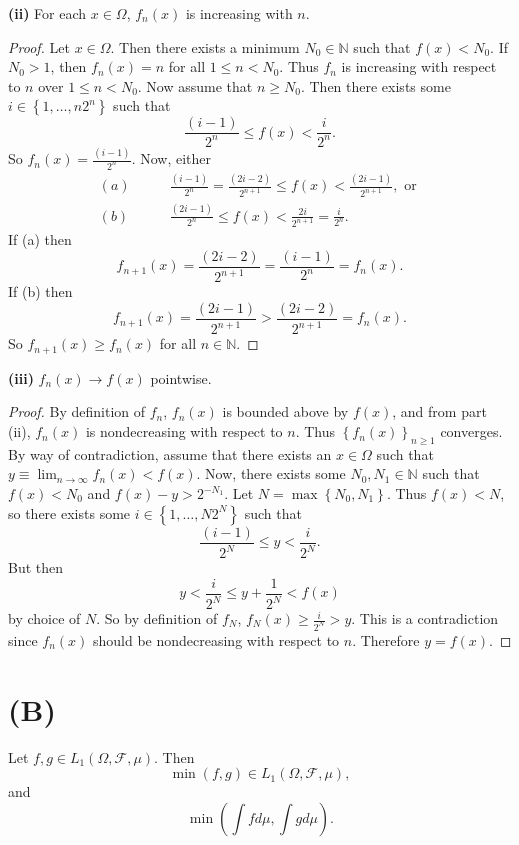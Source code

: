 \documentclass[12pt]{article}
\begin{document}
{\bf (ii)} For each $x \in \Omega$, $f_{n}(x)$ is increasing with $n$.
\begin{proof}
Let $x \in \Omega$. Then there exists a minimum $N_{0} \in \mathbb{N}$ such that $f(x) < N_{0}$. If $N_{0} > 1$, then $f_{n}(x) = n$ for all $1 \leq n
< N_{0}$. Thus $f_{n}$ is increasing with respect to $n$ over $1 \leq n < N_{0}$. Now assume that $n \geq N_{0}$. Then there exists some $i \in
\left\{ 1, \hdots, n2^{n} \right\}$ such that 
\[ \frac{(i-1)}{2^{n}} \leq f(x) < \frac{i}{2^{n}}. \]
So $f_{n}(x) = \frac{(i-1)}{2^{n}}$. Now, either 
\begin{align*}
(a) \qquad & \frac{(i-1)}{2^{n}} = \frac{(2i - 2)}{2^{n+1}} \leq f(x) < \frac{(2i-1)}{2^{n+1}}, \text{ or } \\
(b) \qquad & \frac{(2i-1)}{2^{n}} \leq f(x) < \frac{2i}{2^{n+1}} = \frac{i}{2^{n}}.
\end{align*}
If (a) then 
\[ f_{n+1}(x) = \frac{(2i-2)}{2^{n+1}} = \frac{(i-1)}{2^{n}} = f_{n}(x). \]
If (b) then 
\[ f_{n+1}(x) = \frac{(2i-1)}{2^{n+1}} > \frac{(2i-2)}{2^{n+1}} = f_{n}(x). \]
So $f_{n+1}(x) \geq f_{n}(x)$ for all $n \in \mathbb{N}$.
\end{proof}

\vspace{10mm}



{\bf (iii)} $f_{n}(x) \rightarrow f(x)$ pointwise.
\begin{proof}
By definition of $f_{n}$, $f_{n}(x)$ is bounded above by $f(x)$, and from part (ii), 
$f_{n}(x)$ is nondecreasing with respect to $n$. Thus $\left\{ f_{n}(x) \right\}_{n\geq 1}$ converges.
By way of contradiction, assume that there exists an $x \in \Omega$ such that $y \equiv \lim_{n\rightarrow \infty}f_{n}(x) < f(x)$. 
Now, there exists some $N_{0},N_{1} \in \mathbb{N}$ such that $f(x) < N_{0}$ and $f(x) - y > 2^{-N_{1}}$. Let $N =
\max\left\{ N_{0}, N_{1} \right\}$. Thus $f(x) < N$, so there exists some $i \in \left\{ 1, \hdots, N2^{N} \right\}$ such that 
\[ \frac{(i-1)}{2^{N}} \leq y < \frac{i}{2^{N}}. \]
But then 
\[ y < \frac{i}{2^{N}} \leq y + \frac{1}{2^{N}} < f(x) \]
by choice of $N$. So by definition of $f_{N}$, $f_{N}(x) \geq \frac{i}{2^{N}} > y$. This is a contradiction since $f_{n}(x)$ should be nondecreasing with respect to $n$.
Therefore $y = f(x)$.
\end{proof}



\newpage 
\section*{(B)}
Let $f,g \in L_{1}\left( \Omega, \mathcal{F}, \mu \right)$. Then 
\[ \min (f,g) \in L_{1}\left( \Omega, \mathcal{F}, \mu \right), \]
and 
\[ \min\left( \int fd\mu, \int gd\mu \right). \]
\end{document}
